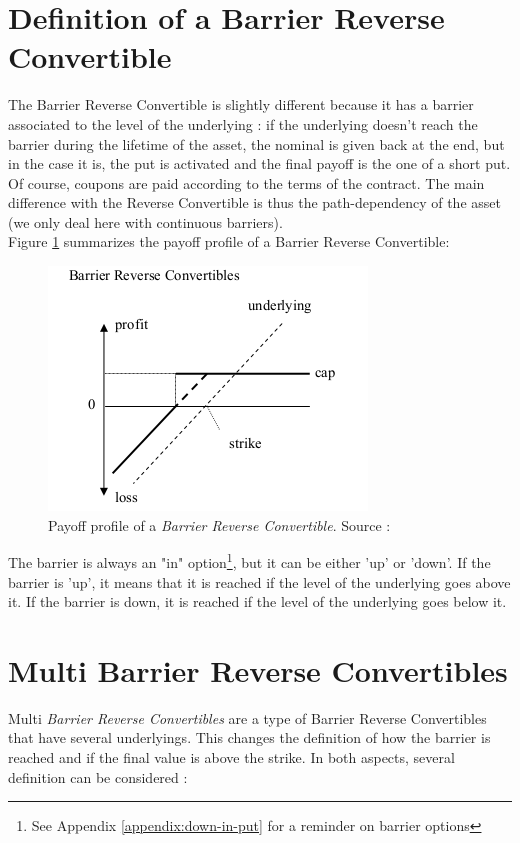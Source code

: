 \documentclass[a4paper,11pt,english]{book}
\begin{document}
\section{Definition of a Barrier Reverse Convertible}
\label{sec:BRC-definition}

The Barrier Reverse Convertible is slightly different because it has a barrier associated to the level of the underlying : if the underlying doesn't reach the barrier during the lifetime of the asset, the nominal is given back at the end, but in the case it is, the put is activated and the final payoff is the one of a short put. Of course, coupons are paid according to the terms of the contract. The main difference with the Reverse Convertible is thus the path-dependency of the asset (we only deal here with continuous barriers). \\

Figure \ref{fig:BRC-payoff} summarizes the payoff profile of a Barrier Reverse Convertible:

\begin{figure}[H]
    \centering
    \includegraphics[scale=0.65]{images/BRC.png}
    \caption{Payoff profile of a \textit{Barrier Reverse Convertible}. Source : \cite{lindauer2008pricing}}
    \label{fig:BRC-payoff}
\end{figure}

The barrier is always an "in" option\footnote{See Appendix \ref{appendix:down-in-put} for a reminder on barrier options}, but it can be either 'up' or 'down'. If the barrier is 'up', it means that it is reached if the level of the underlying goes above it. If the barrier is down, it is reached if the level of the underlying goes below it.

\section{Multi Barrier Reverse Convertibles}
\label{sec:multi-BRC-definition}
Multi \textit{Barrier Reverse Convertibles} are a type of Barrier Reverse Convertibles that have several underlyings. This changes the definition of how the barrier is reached and if the final value is above the strike. In both aspects, several definition can be considered :
\end{document}
